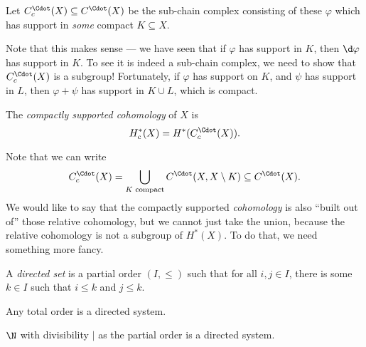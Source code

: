 \documentclass[a4paper]{article}
\begin{document}
\begin{defi}
  Let $C_c^\Cdot(X) \subseteq C^\Cdot(X)$ be the sub-chain complex consisting of these $\varphi$ which has support in \emph{some} compact $K \subseteq X$.
\end{defi}
Note that this makes sense --- we have seen that if $\varphi$ has support in $K$, then $\d \varphi$ has support in $K$. To see it is indeed a sub-chain complex, we need to show that $C_c^\Cdot(X)$ is a subgroup! Fortunately, if $\varphi$ has support on $K$, and $\psi$ has support in $L$, then $\varphi + \psi$ has support in $K \cup L$, which is compact.

\begin{defi}
  The \emph{compactly supported cohomology} of $X$ is
  \[
    H^*_c(X) = H^*(C_c^\Cdot(X)).
  \]
\end{defi}

Note that we can write
\[
  C_c^{\Cdot}(X) = \bigcup_{K\text{ compact}} C^\Cdot(X, X \setminus K) \subseteq C^\Cdot(X).
\]
We would like to say that the compactly supported \emph{cohomology} is also ``built out of'' those relative cohomology, but we cannot just take the union, because the relative cohomology is not a subgroup of $H^*(X)$. To do that, we need something more fancy.

\begin{defi}
  A \emph{directed set} is a partial order $(I, \leq)$ such that for all $i, j \in I$, there is some $k \in I$ such that $i \leq k$ and $j \leq k$.
\end{defi}

\begin{eg}
  Any total order is a directed system.
\end{eg}

\begin{eg}
  $\N$ with divisibility $\mid$ as the partial order is a directed system.
\end{eg}
\end{document}
